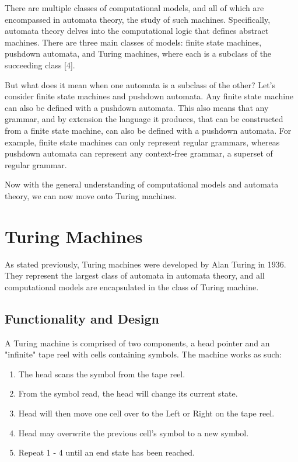 \documentclass[11pt]{article}
\begin{document}
There are multiple classes of computational models, and all of which are encompassed in automata theory, the study of such machines. Specifically, automata theory delves into the computational logic that defines abstract machines. There are three main classes of models: finite state machines, pushdown automata, and Turing machines, where each is a subclass of the succeeding class [4].

But what does it mean when one automata is a subclass of the other? Let's consider finite state machines and pushdown automata. Any finite state machine can also be defined with a pushdown automata. This also means that any grammar, and by extension the language it produces, that can be constructed from a finite state machine, can also be defined with a pushdown automata. For example, finite state machines can only represent regular grammars, whereas pushdown automata can represent any context-free grammar, a superset of regular grammar. 

Now with the general understanding of computational models and automata theory, we can now move onto Turing machines.


\section{Turing Machines}

As stated previously, Turing machines were developed by Alan Turing in 1936. They represent the largest class of automata in automata theory, and all computational models are encapsulated in the class of Turing machine.

\subsection{Functionality and Design}
 A Turing machine is comprised of two components, a head pointer and an "infinite" tape reel with cells containing symbols. The machine works as such: 
\begin{enumerate}

\item The head scans the symbol from the tape reel.
\item From the symbol read, the head will change its current state.
\item Head will then move one cell over to the Left or Right on the tape reel.
\item Head may overwrite the previous cell's symbol to a new symbol.
\item Repeat 1 - 4 until an end state has been reached.

\end{enumerate}
\end{document}
